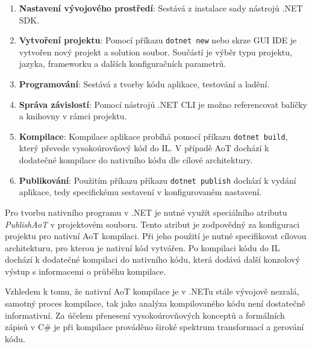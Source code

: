 \begin{enumerate}
    \item \textbf{Nastavení vývojového prostředí}: Sestává z instalace sady nástrojů .NET SDK.
    
    \item \textbf{Vytvoření projektu}: Pomocí příkazu \texttt{dotnet new} nebo skrze GUI IDE je vytvořen nový projekt a solution soubor. Součástí je výběr typu projektu, jazyka, frameworku a dalších konfiguračních parametrů.
    
    \item \textbf{Programování}: Sestává z tvorby kódu aplikace, testování a ladění.

    \item \textbf{Správa závislostí}: Pomocí nástrojů .NET CLI je možno referencovat balíčky a knihovny v rámci projektu.
    
    \item \textbf{Kompilace}: Kompilace aplikace probíhá pomocí příkazu \texttt{dotnet build}, který převede vysokoúrovňový kód do IL. V případě AoT dochází k dodatečné kompilace do nativního kódu dle cílové architektury.
    
    \item \textbf{Publikování}: Použitím příkazu příkazu \texttt{dotnet publish} dochází k vydání aplikace, tedy specifickému sestavení v konfigurovaném nastavení.
\end{enumerate}


Pro tvorbu nativního programu v .NET je nutné využít speciálního atributu \emph{PublishAoT} v projektovém souboru. Tento atribut je zodpovědný za konfiguraci projektu pro nativní AoT kompilaci. Při jeho použití je nutné specifikovat cílovou architekturu, pro kterou je nativní kód vytvářen. Po kompilaci kódu do IL dochází k dodatečné kompilaci do nativního kódu, která dodává další konzolový výstup s informacemi o průběhu kompilace.

Vzhledem k tomu, že nativní AoT kompilace je v .NETu stále vývojově nezralá, samotný proces kompilace, tak jako analýza kompilovaného kódu není dostatečně informativní. Za účelem přenesení vysokoúrovňových konceptů a formálních zápisů v C\# je při kompilace prováděno široké spektrum transformací a gerování kódu.




